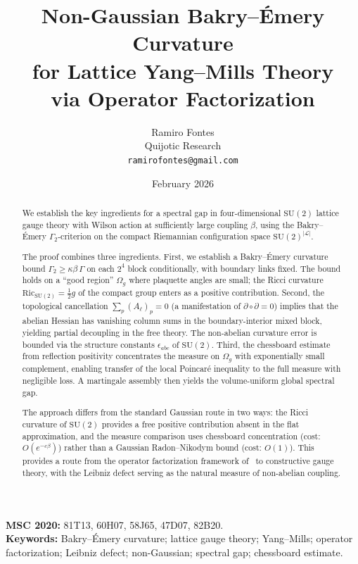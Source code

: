 \documentclass[11pt,a4paper]{article}
\title{Non-Gaussian Bakry--\'Emery Curvature\\
for Lattice Yang--Mills Theory\\
via Operator Factorization}
\author{Ramiro Fontes\\
Quijotic Research\\
\texttt{ramirofontes@gmail.com}}
\date{February 2026}
\theoremstyle{plain}
\theoremstyle{definition}
\theoremstyle{remark}
\newcommand{\SU}{\mathrm{SU}}
\newcommand{\Ric}{\mathrm{Ric}}
\newcommand{\cL}{\mathcal{L}}
\begin{document}
\maketitle

\begin{abstract}
We establish the key ingredients for a spectral gap in
four-dimensional $\SU(2)$ lattice gauge
theory with Wilson action at sufficiently large coupling $\beta$,
using the Bakry--\'Emery $\Gamma_2$-criterion on
the compact Riemannian configuration space $\SU(2)^{|\cL|}$.

The proof combines three ingredients. First, we establish a
Bakry--\'Emery curvature bound
$\Gamma_2 \geq \kappa\beta\,\Gamma$ on each $2^4$ block
conditionally, with boundary links fixed. The bound holds on a
``good region'' $\Omega_g$ where plaquette angles are small; the
Ricci curvature $\Ric_{\SU(2)} = \frac{1}{2}g$ of the compact group
enters as a positive contribution. Second, the topological
cancellation $\sum_p (A_\ell)_p = 0$ (a manifestation of
$\partial\circ\partial = 0$) implies that the abelian Hessian
has vanishing column sums in the boundary-interior mixed block,
yielding partial decoupling in the free theory. The non-abelian curvature error
is bounded via the structure constants $\epsilon_{abc}$ of
$\SU(2)$. Third, the chessboard estimate from reflection positivity
concentrates the measure on $\Omega_g$ with exponentially small
complement, enabling transfer of the local Poincar\'e inequality to
the full measure with negligible loss. A martingale assembly then
yields the volume-uniform global spectral gap.

The approach differs from the standard Gaussian route in two ways:
the Ricci curvature of $\SU(2)$ provides a free positive
contribution absent in the flat approximation, and the measure
comparison uses chessboard concentration (cost: $O(e^{-c\beta})$)
rather than a Gaussian Radon--Nikodym bound (cost: $O(1)$).
This provides a route from the operator factorization framework
of~\cite{Fontes2026a,Fontes2026d} to constructive gauge theory,
with the Leibniz defect serving as the natural measure of
non-abelian coupling.
\end{abstract}

\medskip
\noindent\textbf{MSC 2020:} 81T13, 60H07, 58J65, 47D07, 82B20.\\
\textbf{Keywords:} Bakry--\'Emery curvature; lattice gauge theory;
Yang--Mills; operator factorization; Leibniz defect; non-Gaussian;
spectral gap; chessboard estimate.
\end{document}
